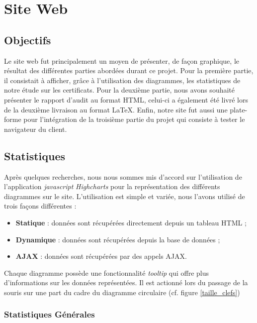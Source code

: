 \chapter{Site Web}

\section{Objectifs}

Le site web fut principalement un moyen de présenter, de façon graphique, le résultat des différentes parties abordées durant ce projet. Pour la première partie, il consistait à afficher, grâce à l'utilisation des diagrammes, les statistiques de notre étude sur les certificats. Pour la deuxième partie, nous avons souhaité présenter le rapport d'audit au format HTML, celui-ci a également été livré lors de la deuxième livraison au format LaTeX. Enfin, notre site fut aussi une plate-forme pour l'intégration de la troisième partie du projet qui consiste à tester le navigateur du client. \\


\section{Statistiques}

Après quelques recherches, nous nous sommes mis d'accord sur l'utilisation de l'application \textit{javascript} \textit{Highcharts} pour la représentation des différents diagrammes sur le site. L'utilisation est simple et variée, nous l'avons utilisé de trois façons différentes : 
\begin{itemize}
\item \textbf{Statique} : données sont récupérées directement depuis un tableau HTML ;
\item \textbf{Dynamique} : données sont récupérées depuis la base de données ;
\item \textbf{AJAX} : données sont récupérées par des appels AJAX.\\
\end{itemize}

Chaque diagramme possède une fonctionnalité \textit{tooltip} qui offre plus d'informations sur les données représentées. Il est actionné lors du passage de la souris sur une part du cadre du diagramme circulaire (cf. figure \ref{taille_clefs})

\subsection{Statistiques Générales}

